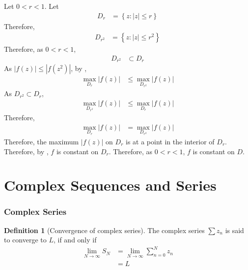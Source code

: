 \documentclass[titlepage, fleqn, a4paper, 12pt, twoside]{article}
\theoremstyle{definition}
\newtheorem{definition}{Definition}
\theoremstyle{theorem}
\begin{document}
\begin{solution}
	Let $0 < r < 1$.
	Let
	\begin{align*}
		D_r & = \left\{ z : |z| \le r \right\}
	\end{align*}
	Therefore,
	\begin{align*}
		D_{r^2} & = \left\{ z : |z| \le r^2 \right\}
	\end{align*}
	Therefore, as $0 < r < 1$,
	\begin{align*}
		D_{r^2} & \subset D_r
	\end{align*}
	As $\left| f(z) \right| \le \left| f\left( z^2 \right) \right|$, by ,
	\begin{align*}
		\max\limits_{D_r}\left| f(z) \right| &\le \max\limits_{D_{r^2}}\left| f(z) \right|
	\end{align*}
	As $D_{r^2} \subset D_r$,
	\begin{align*}
		\max\limits_{D_{r^2}}\left| f(z) \right| & \le \max\limits_{D_r}\left| f(z) \right|
	\end{align*}
	Therefore,
	\begin{align*}
		\max\limits_{D_r}\left| f(z) \right| & = \max\limits_{D_{r^2}}\left| f(z) \right|
	\end{align*}
	Therefore, the maximum $\left| f(z) \right|$ on $D_r$ is at a point in the interior of $D_r$.
	Therefore, by , $f$ is constant on $D_r$.
	Therefore, as $0 < r < 1$, $f$ is constant on $D$.
\end{solution}

\newpage
\part{Complex Sequences and Series}

\section{Complex Series}

\begin{definition}[Convergence of complex series]
	The complex series $\sum z_n$ is said to converge to $L$, if and only if
	\begin{align*}
		\lim\limits_{N \to \infty} S_N & = \lim\limits_{N \to \infty} \sum\limits_{n = 0}^{N} z_n \\
                                               & = L
	\end{align*}
\end{definition}
\end{document}
